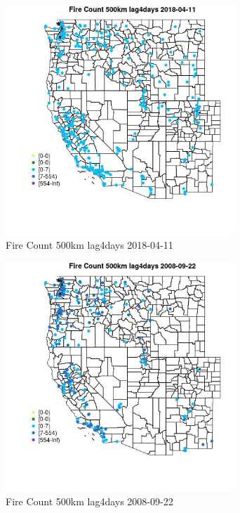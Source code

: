 \begin{figure} 
\centering  
\includegraphics[width=0.77\textwidth]{Code_Outputs/Report_ML_input_PM25_Step4_part_e_de_duplicated_aves_compiled_2019-05-18wNAs_MapObsFire_Count_500km_lag4days2018-04-11.jpg} 
\caption{\label{fig:Report_ML_input_PM25_Step4_part_e_de_duplicated_aves_compiled_2019-05-18wNAsMapObsFire_Count_500km_lag4days2018-04-11}Fire Count 500km lag4days 2018-04-11} 
\end{figure} 
 

\begin{figure} 
\centering  
\includegraphics[width=0.77\textwidth]{Code_Outputs/Report_ML_input_PM25_Step4_part_e_de_duplicated_aves_compiled_2019-05-18wNAs_MapObsFire_Count_500km_lag4days2008-09-22.jpg} 
\caption{\label{fig:Report_ML_input_PM25_Step4_part_e_de_duplicated_aves_compiled_2019-05-18wNAsMapObsFire_Count_500km_lag4days2008-09-22}Fire Count 500km lag4days 2008-09-22} 
\end{figure} 
 

